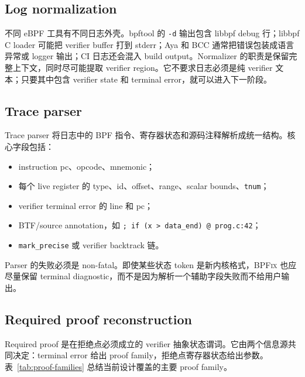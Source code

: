 \documentclass[letterpaper,twocolumn,10pt]{article}
\newcommand{\sys}{\textsc{BPFix}\xspace}
\newcommand{\code}[1]{\texttt{#1}}
\begin{document}
\subsection{Log normalization}

不同 eBPF 工具有不同日志外壳。bpftool 的 \code{-d} 输出包含 libbpf debug 行；libbpf C loader 可能把 verifier buffer 打到 stderr；Aya 和 BCC 通常把错误包装成语言异常或 logger 输出；CI 日志还会混入 build output。Normalizer 的职责是保留完整上下文，同时尽可能提取 verifier region。它不要求日志必须是纯 verifier 文本；只要其中包含 verifier state 和 terminal error，就可以进入下一阶段。

\subsection{Trace parser}

Trace parser 将日志中的 BPF 指令、寄存器状态和源码注释解析成统一结构。核心字段包括：
\begin{itemize}
  \item instruction pc、opcode、mnemonic；
  \item 每个 live register 的 type、id、offset、range、scalar bounds、\code{tnum}；
  \item verifier terminal error 的 line 和 pc；
  \item BTF/source annotation，如 \code{; if (x > data\_end) @ prog.c:42}；
  \item \code{mark\_precise} 或 verifier backtrack 链。
\end{itemize}

Parser 的失败必须是 non-fatal。即使某些状态 token 是新内核格式，\sys 也应尽量保留 terminal diagnostic，而不是因为解析一个辅助字段失败而不给用户输出。

\subsection{Required proof reconstruction}

Required proof 是在拒绝点必须成立的 verifier 抽象状态谓词。它由两个信息源共同决定：terminal error 给出 proof family，拒绝点寄存器状态给出参数。表~\ref{tab:proof-families} 总结当前设计覆盖的主要 proof family。
\end{document}
